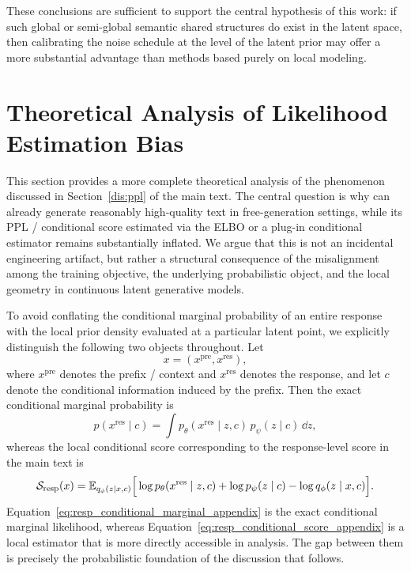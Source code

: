 These conclusions are sufficient to support the central hypothesis of this work: if such global or semi-global semantic shared structures do exist in the latent space, then calibrating the noise schedule at the level of the latent prior may offer a more substantial advantage than methods based purely on local modeling.

\section{Theoretical Analysis of Likelihood Estimation Bias}
\label{sec:likelihood_mismatch_appendix}

This section provides a more complete theoretical analysis of the phenomenon discussed in Section~\ref{dis:ppl} of the main text. The central question is why \method can already generate reasonably high-quality text in free-generation settings, while its PPL / conditional score estimated via the ELBO or a plug-in conditional estimator remains substantially inflated. We argue that this is not an incidental engineering artifact, but rather a structural consequence of the misalignment among the training objective, the underlying probabilistic object, and the local geometry in continuous latent generative models.

To avoid conflating the conditional marginal probability of an entire response with the local prior density evaluated at a particular latent point, we explicitly distinguish the following two objects throughout. Let
\[
x=(x^{\mathrm{pre}},x^{\mathrm{res}}),
\]
where $x^{\mathrm{pre}}$ denotes the prefix / context and $x^{\mathrm{res}}$ denotes the response, and let $c$ denote the conditional information induced by the prefix. Then the exact conditional marginal probability is
\begin{equation}
p(x^{\mathrm{res}}\mid c)
=
\int p_{\theta}(x^{\mathrm{res}}\mid z,c)\,p_{\psi}(z\mid c)\,\dd z,
\label{eq:resp_conditional_marginal_appendix}
\end{equation}
whereas the local conditional score corresponding to the response-level score in the main text is
\begin{equation}
\mathcal S_{\mathrm{resp}}(x)
=
\mathbb{E}_{q_{\phi}(z\mid x,c)}
\Big[
\log p_{\theta}(x^{\mathrm{res}}\mid z,c)
+\log p_{\psi}(z\mid c)
-\log q_{\phi}(z\mid x,c)
\Big].
\label{eq:resp_conditional_score_appendix}
\end{equation}
Equation~\eqref{eq:resp_conditional_marginal_appendix} is the exact conditional marginal likelihood, whereas Equation~\eqref{eq:resp_conditional_score_appendix} is a local estimator that is more directly accessible in analysis. The gap between them is precisely the probabilistic foundation of the discussion that follows.

